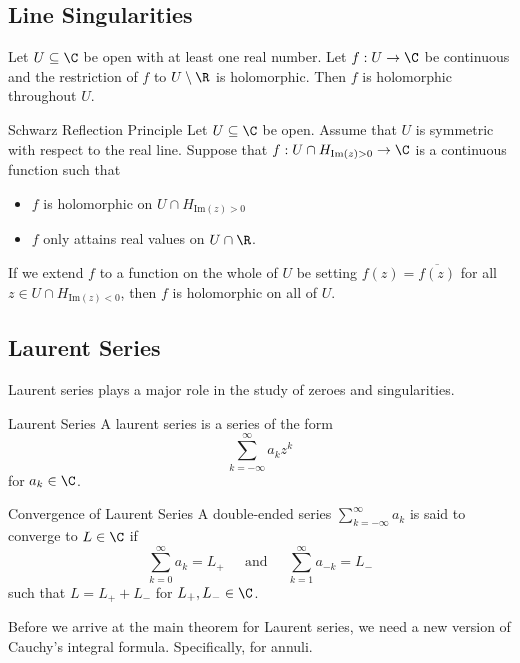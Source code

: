 \documentclass[a4paper]{article}
\begin{document}
\subsection{Line Singularities}
\begin{thm}{}{} Let $U\subseteq\C$ be open with at least one real number. Let $f:U\to\C$ be continuous and the restriction of $f$ to $U\setminus\R$ is holomorphic. Then $f$ is holomorphic throughout $U$. 
\end{thm}

\begin{thm}{Schwarz Reflection Principle}{} Let $U\subseteq\C$ be open. Assume that $U$ is symmetric with respect to the real line. Suppose that $f:U\cap H_{\text{Im}(z)>0}\to\C$ is a continuous function such that 
\begin{itemize}
\item $f$ is holomorphic on $U\cap H_{\text{Im}(z)>0}$
\item $f$ only attains real values on $U\cap\R$. 
\end{itemize}
If we extend $f$ to a function on the whole of $U$ be setting $f(z)=\overline{f(z)}$ for all $z\in U\cap H_{\text{Im}(z)<0}$, then $f$ is holomorphic on all of $U$. 
\end{thm}

\subsection{Laurent Series}
Laurent series plays a major role in the study of zeroes and singularities. 

\begin{defn}{Laurent Series}{} A laurent series is a series of the form $$\sum_{k=-\infty}^\infty a_kz^k$$ for $a_k\in\C$. 
\end{defn}

\begin{defn}{Convergence of Laurent Series}{} A double-ended series $\sum_{k=-\infty}^\infty a_k$ is said to converge to $L\in\C$ if $$\sum_{k=0}^\infty a_k=L_+\;\;\;\;\text{ and }\;\;\;\;\sum_{k=1}^\infty a_{-k}=L_-$$ such that $L=L_++L_-$ for $L_+,L_-\in\C$. 
\end{defn}

Before we arrive at the main theorem for Laurent series, we need a new version of Cauchy's integral formula. Specifically, for annuli. 
\end{document}
